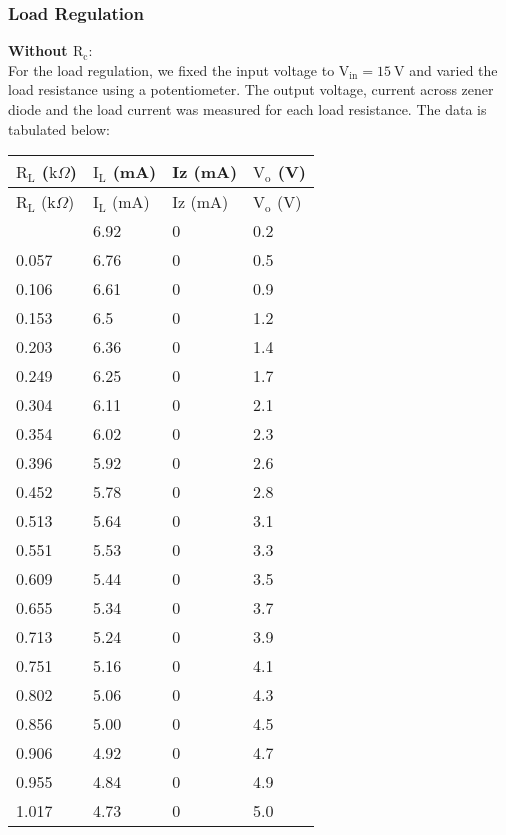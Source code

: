 \documentclass{scrartcl}
\begin{document}
\subsubsection{Load Regulation}
\textbf{Without $\mathrm{R_c}:$ }\\[0.3cm]
For the load regulation, we fixed the input voltage to $\mathrm{V_{in}} = 15 \ \mathrm{V}$ and varied the load resistance using a potentiometer. The output voltage, current across zener diode and the load current was measured for each load resistance. The data is tabulated below:

\begin{longtable}{|l|l|l|l|}
\hline
$\mathrm{R_L}$ ($\mathrm{k}\Omega$) & $\mathrm{I_L}$ (mA) & Iz (mA) & $\mathrm{V_o}$ (V) \\ \hline
\endfirsthead
\hline
$\mathrm{R_L}$ ($\mathrm{k}\Omega$) & $\mathrm{I_L}$ (mA) & Iz (mA) & $\mathrm{V_o}$ (V) \\ \hline
\endhead
\hline
\endfoot
\hline
\endlastfoot
0.007       & 6.92      & 0       & 0.2       \\ \hline
0.057       & 6.76      & 0       & 0.5       \\ \hline
0.106       & 6.61      & 0       & 0.9       \\ \hline
0.153       & 6.5       & 0       & 1.2       \\ \hline
0.203       & 6.36      & 0       & 1.4       \\ \hline
0.249       & 6.25      & 0       & 1.7       \\ \hline
0.304       & 6.11      & 0       & 2.1       \\ \hline
0.354       & 6.02      & 0       & 2.3       \\ \hline
0.396       & 5.92      & 0       & 2.6       \\ \hline
0.452       & 5.78      & 0       & 2.8       \\ \hline
0.513       & 5.64      & 0       & 3.1       \\ \hline
0.551       & 5.53      & 0       & 3.3       \\ \hline
0.609       & 5.44      & 0       & 3.5       \\ \hline
0.655       & 5.34      & 0       & 3.7       \\ \hline
0.713       & 5.24      & 0       & 3.9       \\ \hline
0.751       & 5.16      & 0       & 4.1       \\ \hline
0.802       & 5.06      & 0       & 4.3       \\ \hline
0.856       & 5.00       & 0       & 4.5       \\ \hline
0.906       & 4.92      & 0       & 4.7       \\ \hline
0.955       & 4.84      & 0       & 4.9       \\ \hline
1.017       & 4.73      & 0       & 5.0         \\ \hline
\end{longtable}
\end{document}
